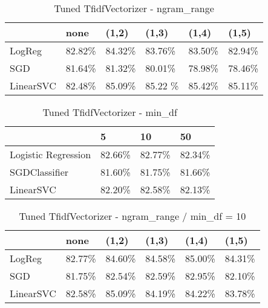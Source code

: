 \documentclass[10pt,conference,compsocconf]{IEEEtran}
\begin{document}
\begin{table}[H]
\center
\caption{Tuned TfidfVectorizer - ngram\_range}
\begin{tabular}{@{}llllll@{}}
    \toprule
    & none & (1,2) & (1,3) & (1,4) & (1,5) \\
    \hline
    LogReg & 82.82\% & 84.32\% & 83.76\% & 83.50\% & 82.94\% \\
    SGD & 81.64\% & 81.32\% & 80.01\% & 78.98\% & 78.46\% \\
    LinearSVC & 82.48\% & 85.09\% & 85.22 \% & 85.42\% & 85.11\%\\
    \bottomrule
\end{tabular}
\end{table}

\begin{table}[H]
\center
\caption{Tuned TfidfVectorizer - min\_df}
\begin{tabular}{@{}llll@{}}
    \toprule
    & 5 & 10 & 50 \\
    \hline
    Logistic Regression & 82.66\% & 82.77\% & 82.34\% \\
    SGDClassifier & 81.60\% & 81.75\% & 81.66\% \\
    LinearSVC & 82.20\% & 82.58\% & 82.13\% \\
    \bottomrule
\end{tabular}
\end{table}

\begin{table}[H]
\center
\caption{Tuned TfidfVectorizer - ngram\_range / min\_df = 10}
\begin{tabular}{@{}>{}llllll@{}}
    \toprule
    & none & (1,2) & (1,3) & (1,4) & (1,5) \\
    \hline
    LogReg & 82.77\% & 84.60\% & 84.58\% & 85.00\% & 84.31\% \\
    SGD & 81.75\% & 82.54\% & 82.59\% & 82.95\% & 82.10\% \\
    LinearSVC & 82.58\% & 85.09\% & 84.19\% & 84.22\% & 83.78\%\\
    \bottomrule
\end{tabular}
\end{table}
\end{document}
